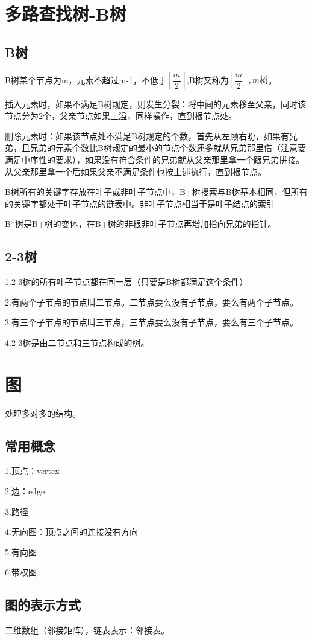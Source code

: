 \documentclass[a4paper]{report}
\begin{document}
\chapter{多路查找树-B树}
\section{B树}
B树某个节点为m，元素不超过m-1，不低于$\left\lceil\dfrac{m}{2}\right\rceil$,B树又称为$\left\lceil\dfrac{m} {2}\right\rceil,m树$。

插入元素时，如果不满足B树规定，则发生分裂：将中间的元素移至父亲，同时该节点分为2个，父亲节点如果上溢，同样操作，直到根节点处。

删除元素时：如果该节点处不满足B树规定的个数，首先从左顾右盼，如果有兄弟，且兄弟的元素个数比B树规定的最小的节点个数还多就从兄弟那里借（注意要满足中序性的要求），如果没有符合条件的兄弟就从父亲那里拿一个跟兄弟拼接。从父亲那里拿一个后如果父亲不满足条件也按上述执行，直到根节点。


B树所有的关键字存放在叶子或非叶子节点中，B+树搜索与B树基本相同，但所有的关键字都处于叶子节点的链表中。非叶子节点相当于是叶子结点的索引

B*树是B+树的变体，在B+树的非根非叶子节点再增加指向兄弟的指针。
\section{2-3树}
1.2-3树的所有叶子节点都在同一层（只要是B树都满足这个条件）

2.有两个子节点的节点叫二节点。二节点要么没有子节点，要么有两个子节点。

3.有三个子节点的节点叫三节点，三节点要么没有子节点，要么有三个子节点。

4.2-3树是由二节点和三节点构成的树。


\chapter{图}
处理多对多的结构。
\section{常用概念}
1.顶点：vertex

2.边：edge

3.路径

4.无向图：顶点之间的连接没有方向

5.有向图

6.带权图
\section{图的表示方式}
二维数组（邻接矩阵），链表表示：邻接表。
\end{document}
